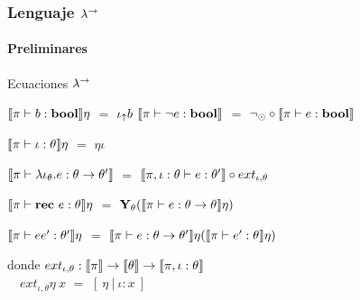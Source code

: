 \documentclass{beamer}
\begin{document}
\begin{frame}
\frametitle{Lenguaje $\lambda^{\rightarrow}$}
\framesubtitle{Preliminares}

\begin{block}{Ecuaciones $\lambda^{\rightarrow}$}
\begin{center}
$\llbracket \pi \vdash b : \textbf{bool} \rrbracket \eta$ $=$ $\iota_{\uparrow} b$ \quad \quad \quad
$\llbracket \pi \vdash \neg e : \textbf{bool} \rrbracket$ $=$ $\neg_{\odot} \circ \llbracket \pi \vdash e : \textbf{bool} \rrbracket$
\end{center}

\begin{center}
$\llbracket \pi \vdash \iota : \theta \rrbracket\eta$ $=$ $\eta \iota$
\end{center}

\begin{center}
$\llbracket \pi \vdash \lambda \iota_{\theta} . e : \theta \rightarrow \theta' \rrbracket$ $=$
		$\llbracket \pi,\iota:\theta \vdash e : \theta' \rrbracket \circ ext_{\iota,\theta}$
\end{center}

\begin{center}
$\llbracket \pi \vdash \textbf{rec} \ e : \theta \rrbracket\eta$ $=$ $\textbf{Y}_{\theta} (\llbracket \pi \vdash e : \theta \rightarrow \theta \rrbracket\eta)$
\end{center}

\begin{center}
$\llbracket \pi \vdash ee' : \theta' \rrbracket\eta$ $=$ $\llbracket \pi \vdash e : \theta \rightarrow \theta' \rrbracket\eta (\llbracket \pi \vdash e' : \theta \rrbracket\eta)$
\end{center}

\end{block}

donde 
$ext_{\iota,\theta} : \llbracket \pi \rrbracket 
					  \rightarrow \llbracket \theta \rrbracket \rightarrow \llbracket \pi,\iota:\theta \rrbracket$\\
\quad \quad \ \
$ext_{\iota,\theta} \eta \ x$ $=$ $[\ \eta \ | \ \iota:x \ ]$
\end{frame}
\end{document}

